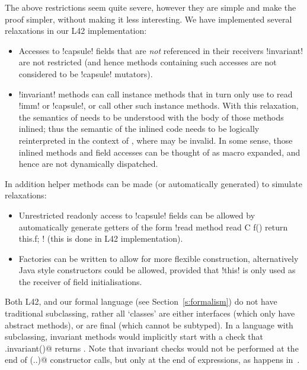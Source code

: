 The above restrictions seem quite severe, however they are simple and make the proof simpler, without making it less interesting. We have implemented several relaxations in our L42 implementation:
\begin{itemize}
	\item Accesses to \Q!capsule! fields that are \emph{not} referenced in their receivers \Q!invariant! are not restricted (and hence methods containing such accesses are not considered to be \Q!capsule! mutators).
	
	\item \Q!invariant! methods can call instance methods that in turn only use \Q@this@ to read \Q!imm! or \Q!capsule!, or call other such instance methods. With this relaxation, the semantics of \Q@invariant@ needs to be understood with the body of those methods inlined; thus the semantic of the inlined code needs to be logically reinterpreted in the context of \Q@invariant@, where \Q@this@ may be invalid. In some sense, those inlined methods and field accesses can be thought of as macro expanded, and hence are not dynamically dispatched. 

\end{itemize}

In addition helper methods can be made (or automatically generated) to simulate relaxations:
\begin{itemize}
	\item Unrestricted readonly access to \Q!capsule! fields can be allowed by automatically generate getters of the form \Q!read method read C f() { return this.f; }! (this is done in L42 implementation).
	\item Factories can be written to allow for more flexible construction, alternatively Java style constructors could be allowed, provided that \Q!this! is only used as the receiver of field initialisations.
\end{itemize}
Both L42, and our formal language (see Section~\ref{s:formalism}) do not have traditional subclassing, rather all `classes' are either interfaces (which only have abstract methods), or are final (which cannot be subtyped). In a language with subclassing, invariant methods would implicitly start with a check that \Q@super.invariant()@ returns \Q@true@. Note that invariant checks would not be performed at the end of \Q@super(..)@ constructor calls, but only at the end of \Q@new@ expressions, as happens in~\cite{feldman2006jose}.

